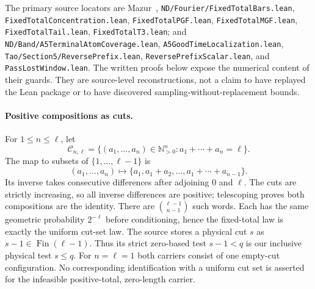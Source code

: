 The primary source locators are Mazur~\cite{Mazur2026v2},
\texttt{ND/Fourier/FixedTotalBars.lean},
\texttt{FixedTotalConcentration.lean}, \texttt{FixedTotalPGF.lean},
\texttt{FixedTotalMGF.lean}, \texttt{FixedTotalTail.lean},
\texttt{FixedTotalT3.lean}; and
\texttt{ND/Band/A5TerminalAtomCoverage.lean},
\texttt{A5GoodTimeLocalization.lean},
\texttt{Tao/Section5/ReversePrefix.lean},
\texttt{ReversePrefixScalar.lean}, and \texttt{PassLostWindow.lean}.
The written proofs below expose the numerical content of their guards.
They are source-level reconstructions, not a claim to have replayed the
Lean package or to have discovered sampling-without-replacement bounds.

\paragraph{Positive compositions as cuts.}
For $1\le n\le\ell$, let
\[
 \mathcal C_{n,\ell}=\{(a_1,\ldots,a_n)\in\mathbb N_{>0}^n:
                       a_1+\cdots+a_n=\ell\}.
\]
The map to subsets of $\{1,\ldots,\ell-1\}$ is
\begin{equation}
 (a_1,\ldots,a_n)\longmapsto
 \{a_1,a_1+a_2,\ldots,a_1+\cdots+a_{n-1}\}.
 \label{eq:Mazur-cuts}
\end{equation}
Its inverse takes consecutive differences after adjoining $0$ and $\ell$.
The cuts are strictly increasing, so all inverse differences are positive;
telescoping proves both compositions are the identity.
There are $\binom{\ell-1}{n-1}$ such words. Each has the same geometric
probability $2^{-\ell}$ before conditioning, hence the fixed-total law
is exactly the uniform cut-set law. The source stores a physical cut
$s$ as $s-1\in\operatorname{Fin}(\ell-1)$. Thus its strict zero-based
test $s-1<q$ is our inclusive physical test $s\le q$.
For $n=\ell=1$ both carriers consist of one empty-cut configuration.
No corresponding identification with a uniform cut set is asserted
for the infeasible positive-total, zero-length carrier.

